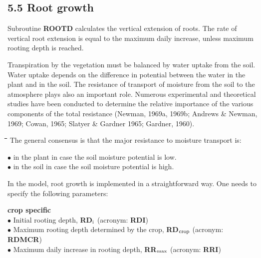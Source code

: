 \documentclass[11pt]{article}
\begin{document}
\subsection{  5.5 Root growth  }

\bigskip
Subroutine {\bf ROOTD} calculates the vertical extension of roots. The rate of vertical root
extension is equal to the maximum daily increase, unless maximum rooting depth is
reached.

\bigskip
Transpiration by the vegetation must be balanced by water uptake from the soil. Water
uptake depends on the difference in potential between the water in the plant and in the
soil. The resistance of transport of moisture from the soil to the atmo\-sphere plays also an
important role. Numerous experimental and theoretical studies have been conducted to
determine the relative importance of the various components of the total resistance
(Newman, 1969a, 1969b; Andrews \& Newman, 1969; Cowan, 1965; Slatyer \& Gardner
1965; Gardner, 1960).\nwln
\begin{tabbing}
\hspace{1.27cm}\=\hspace{1.27cm}\=\hspace{1.27cm}\=\hspace{1.27cm}\=%
\hspace{1.27cm}\=\hspace{1.27cm}\=\hspace{1.27cm}\=\hspace{1.27cm}\=%
\hspace{1.27cm}\=\hspace{1.27cm}\=\kill
The general consensus is that the major resistance to moisture transport is:\> \> \> \> \> \> \> \> \> \>  
\end{tabbing}
$\bullet$ in the plant in case the soil moisture potential is low.\\
$\bullet$ in the soil in case the soil moisture potential is high.

\bigskip
\bigskip
In the model, root growth is implemented in a straightforward way. One needs to specify
the following parameters:

{\bf crop specific} \\
$\bullet$ Initial rooting depth, {\bf RD$_{{\rm i}}$} (acronym: {\bf RDI})\\
$\bullet$ Maximum rooting depth determined by the crop, {\bf RD$_{{\rm crop}}$} (acronym: {\bf RDMCR})\\
$\bullet$ Maximum daily increase in rooting depth, {\bf RR$_{{\rm max}}$} (acronym: {\bf RRI})
\end{document}
